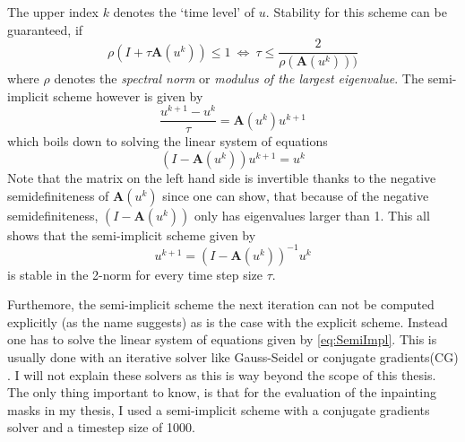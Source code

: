 The upper index $k$ denotes the `time level' of $u$.
Stability for this scheme can be guaranteed, if 
\begin{equation}
    \rho(I + \tau\mathbf{A}(u^k)) \leq 1\ \Leftrightarrow\ \tau \leq \frac{2}{\rho(\mathbf{A}(u^k)))}
\end{equation}
where $\rho$ denotes the \textit{spectral norm} or \textit{modulus of the largest
eigenvalue}.\cite{www13}
The semi-implicit scheme however is given by
\begin{equation}
    \frac{u^{k+1} - u^{k}}{\tau} = \mathbf{A}(u^k)u^{k+1}
\end{equation}
which boils down to solving the linear system of equations
\begin{equation}
    (I-\mathbf{A}(u^k))u^{k+1} = u^k\label{eq:SemiImpl}
\end{equation}
Note that the matrix on the left hand side is invertible thanks to the negative semidefiniteness of
$\mathbf{A}(u^k)$ since one can show, that because of the negative semidefiniteness, $(I-\mathbf{A}(u^k))$ only has eigenvalues
larger than 1.
This all shows that the semi-implicit scheme given by 
\begin{equation}
    u^{k+1} = (I- \mathbf{A}(u^k))^{-1}u^k
\end{equation}
is stable in the 2-norm for every time step size $\tau$.

Furthemore, the semi-implicit scheme the next iteration can not be computed explicitly (as the name
suggests) as is the case with the explicit scheme. Instead one has to solve
the linear system of equations given by \eqref{eq:SemiImpl}. This is usually done with an iterative
solver like Gauss-Seidel or conjugate gradients(CG) \cite{conjugateGradients}. I will not explain these solvers as this is way
beyond the scope of this thesis.
The only thing important to know, is that for the evaluation of the inpainting masks in my thesis,
I used a semi-implicit scheme with a conjugate gradients solver and a timestep size of 1000.

